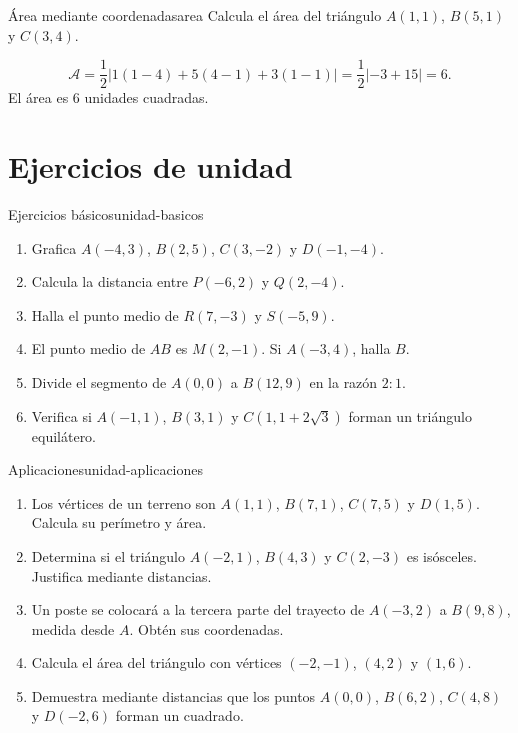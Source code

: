 \begin{example}{Área mediante coordenadas}{area}
Calcula el área del triángulo $A(1,1)$, $B(5,1)$ y $C(3,4)$.
\begin{solution}
\[
\mathcal A=\frac12|1(1-4)+5(4-1)+3(1-1)|
=\frac12|-3+15|=6.
\]
El área es $6$ unidades cuadradas.
\end{solution}
\end{example}

\section{Ejercicios de unidad}

\begin{exercise}{Ejercicios básicos}{unidad-basicos}
\begin{enumerate}
  \item Grafica $A(-4,3)$, $B(2,5)$, $C(3,-2)$ y $D(-1,-4)$.
  \item Calcula la distancia entre $P(-6,2)$ y $Q(2,-4)$.
  \item Halla el punto medio de $R(7,-3)$ y $S(-5,9)$.
  \item El punto medio de $AB$ es $M(2,-1)$. Si $A(-3,4)$, halla $B$.
  \item Divide el segmento de $A(0,0)$ a $B(12,9)$ en la razón $2:1$.
  \item Verifica si $A(-1,1)$, $B(3,1)$ y $C(1,1+2\sqrt3)$ forman un
  triángulo equilátero.
\end{enumerate}
\end{exercise}

\begin{problem}{Aplicaciones}{unidad-aplicaciones}
\begin{enumerate}
  \item Los vértices de un terreno son $A(1,1)$, $B(7,1)$, $C(7,5)$ y
  $D(1,5)$. Calcula su perímetro y área.
  \item Determina si el triángulo $A(-2,1)$, $B(4,3)$ y $C(2,-3)$ es
  isósceles. Justifica mediante distancias.
  \item Un poste se colocará a la tercera parte del trayecto de $A(-3,2)$ a
  $B(9,8)$, medida desde $A$. Obtén sus coordenadas.
  \item Calcula el área del triángulo con vértices $(-2,-1)$, $(4,2)$ y
  $(1,6)$.
  \item Demuestra mediante distancias que los puntos $A(0,0)$, $B(6,2)$,
  $C(4,8)$ y $D(-2,6)$ forman un cuadrado.
\end{enumerate}
\end{problem}

